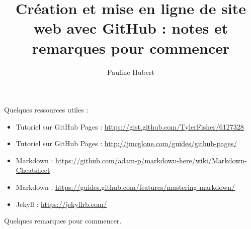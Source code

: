 \documentclass[letter,12pt]{article}
\title{Création et mise en ligne de site web avec GitHub : notes et remarques pour commencer}
\author{Pauline Hubert}
\begin{document}
	\maketitle
	
	Quelques ressources utiles : 
	\begin{itemize}
		\item Tutoriel sur GitHub Pages : \url{https://gist.github.com/TylerFisher/6127328}
		\item Tutoriel sur GitHub Pages : \url{http://jmcglone.com/guides/github-pages/}
		\item Markdown : \url{https://github.com/adam-p/markdown-here/wiki/Markdown-Cheatsheet}
		\item Markdown : \url{https://guides.github.com/features/mastering-markdown/}
		\item Jekyll : \url{https://jekyllrb.com/}\\
	\end{itemize}
	
	Quelques remarques pour commencer.
	
\end{document}
